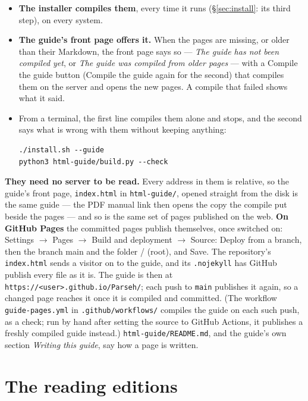 \documentclass[11pt,oneside]{report}
\newcommand{\file}[1]{\texttt{#1}}
\newcommand{\menu}[1]{\textsf{#1}}
\begin{document}
\begin{itemize}
\item \textbf{The installer compiles them}, every time it runs
  (\S\ref{sec:install}: its third step), on every system.
\item \textbf{The guide's front page offers it.} When the pages are missing,
  or older than their Markdown, the front page says so --- \emph{The guide has
  not been compiled yet}, or \emph{The guide was compiled from older pages}
  --- with a \menu{Compile the guide} button (\menu{Compile the guide again}
  for the second) that compiles them on the server and opens the new pages.
  A compile that failed shows what it said.
\item From a terminal, the first line compiles them alone and stops, and the
  second says what is wrong with them without keeping anything:
\begin{lstlisting}
./install.sh --guide
python3 html-guide/build.py --check
\end{lstlisting}
\end{itemize}

\textbf{They need no server to be read.} Every address in them is relative,
so the guide's front page, \file{index.html} in \file{html-guide/}, opened
straight from the disk is the same guide --- the \menu{PDF manual} link then opens the copy the compile put
beside the pages --- and so is the same set of pages published on the web.
\textbf{On GitHub Pages} the committed pages publish themselves, once
switched on: \menu{Settings} $\rightarrow$ \menu{Pages} $\rightarrow$
\menu{Build and deployment} $\rightarrow$ \menu{Source: Deploy from a
branch}, then the branch \menu{main} and the folder \menu{/ (root)}, and
\menu{Save}. The repository's \file{index.html} sends a visitor on to the
guide, and its \file{.nojekyll} has GitHub publish every file as it is. The
guide is then at \texttt{https://<user>.github.io/Parseh/}; each push to
\texttt{main} publishes it again, so a changed page reaches it once it is
compiled and committed. (The workflow \file{guide-pages.yml} in
\file{.github/workflows/} compiles the guide on each such push, as a check;
run by hand after setting the source to \menu{GitHub Actions}, it publishes a
freshly compiled guide instead.)
\file{html-guide/README.md}, and the guide's own section \emph{Writing this
guide}, say how a page is written.

\chapter{The reading editions}
\end{document}
